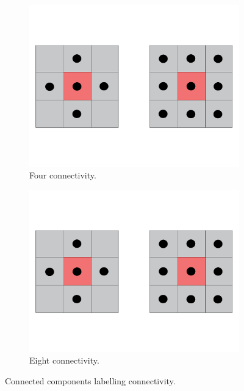 \begin{figure}[!htb]
  \centering
  \begin{subfigure}[b]{0.3\textwidth}
    \centering
    \includegraphics[width=0.6\linewidth]{figures/detection/4_pixel_connectivity.pdf}
    \caption{Four connectivity.}
    \label{fig:four_connectivity}
  \end{subfigure}
  \quad
  \begin{subfigure}[b]{0.3\textwidth}
    \centering
    \includegraphics[width=0.6\linewidth]{figures/detection/8_pixel_connectivity.pdf}
    \caption{Eight connectivity.}
    \label{fig:eight_connectivity}
  \end{subfigure}
  \caption{Connected components labelling connectivity.}
  \label{fig:ccl_connectivity}
\end{figure}

